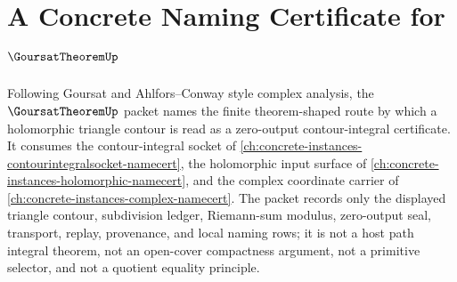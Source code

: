 \chapter{A Concrete Naming Certificate for $\GoursatTheoremUp$}
\label{ch:concrete-instances-goursat-theorem-namecert}

Following Goursat and Ahlfors--Conway style complex analysis, the $\GoursatTheoremUp$ packet names the finite theorem-shaped route by which a holomorphic triangle contour is read as a zero-output contour-integral certificate. It consumes the contour-integral socket of \autoref{ch:concrete-instances-contourintegralsocket-namecert}, the holomorphic input surface of \autoref{ch:concrete-instances-holomorphic-namecert}, and the complex coordinate carrier of \autoref{ch:concrete-instances-complex-namecert}. The packet records only the displayed triangle contour, subdivision ledger, Riemann-sum modulus, zero-output seal, transport, replay, provenance, and local naming rows; it is not a host path integral theorem, not an open-cover compactness argument, not a primitive selector, and not a quotient equality principle.

